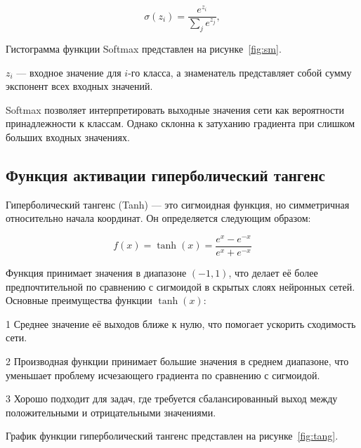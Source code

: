 \begin{equation}
    \sigma{(z_i)} = \frac{e^{z_i}}{\sum_{j} e^{z_j}},
\end{equation}

Гистограмма функции Softmax представлен на рисунке~\ref{fig:sm}.


 $z_i$ — входное значение для $i$-го класса, а знаменатель 
представляет собой сумму экспонент всех входных значений.

Softmax позволяет интерпретировать выходные значения сети как вероятности 
принадлежности к классам. Однако склонна к затуханию градиента при слишком 
больших входных значениях.

\subsection{Функция активации гиперболический тангенс}
\hspace*{12.5 mm}Гиперболический тангенс (Tanh) — это сигмоидная функция, но 
симметричная относительно начала координат. Он определяется следующим образом:

\begin{equation}
    f(x) = \tanh(x) = \frac{e^x - e^{-x}}{e^x + e^{-x}}
\end{equation}

Функция принимает значения в диапазоне $(-1, 1)$, что делает её более 
предпочтительной по сравнению с сигмоидой в скрытых слоях нейронных сетей. 
Основные преимущества функции $\tanh(x)$:

1 Среднее значение её выходов ближе к нулю, что помогает ускорить сходимость 
сети.

2 Производная функции принимает большие значения в среднем диапазоне, что 
уменьшает проблему исчезающего градиента по сравнению с сигмоидой.

3 Хорошо подходит для задач, где требуется сбалансированный выход между 
положительными и отрицательными значениями.

График функции гиперболический тангенс представлен на рисунке~\ref{fig:tang}.


